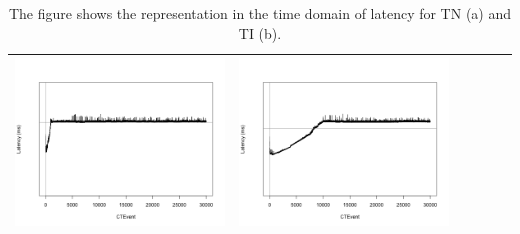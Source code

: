 \begin{table}[htbp]
{\begin{tabular}{l | ccccc}
\begin{minipage}{.15\textwidth}
     			 	\includegraphics[width=\linewidth]{images/lat-log-triple/I14}
    				 \end{minipage}
    			   &	 \begin{minipage}{.15\textwidth}\vspace{2pt}     							
     			 	\includegraphics[width=\linewidth]{images/lat-log-triple/I15}
    				 \end{minipage}\\
		\hline %
	 \end{tabular}
	}
	\caption[\textsc{Analyser} Investigation Stack - Level 2 - Pattern Identification - Latency - Baselines TN and TI]{The figure shows the  representation in the time domain of latency for TN (a) and TI (b).}  
 	\label{tab:level2-latency-triple}
	\end{table}
